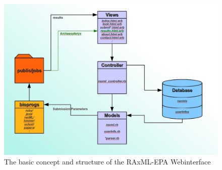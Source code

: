 \documentclass{scrartcl}
\begin{document}
		\begin{figure}[htb]
		\centering
		\includegraphics[scale=0.30]{./RAxMLWS_Concept}
		\caption{The basic concept and structure of the RAxML-EPA Webinterface}
		\label{fig:concept}
		\end{figure}		
		
\end{document}
